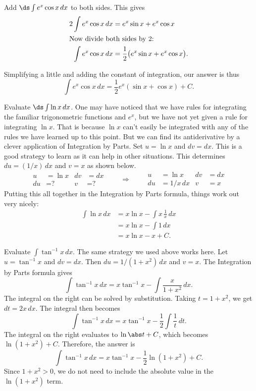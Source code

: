 \begin{example}
Add $\ds\int e^x\cos x\, dx$ to both sides. This gives 
\begin{align*}
2\int e^x\cos x\, dx & = e^x\sin x + e^x\cos x \\
\intertext{Now divide both sides by 2:}
\int e^x\cos x\, dx & = \frac{1}{2}\big(e^x\sin x + e^x\cos x\big).
\end{align*}

Simplifying a little and adding the constant of integration, our answer is thus
\[\int e^x\cos x\, dx = \frac12e^x\left(\sin x + \cos x\right)+C.\]
\end{example}

\begin{example}\label{ex_ibp5}
Evaluate $\ds\int \ln x\,dx$.
\solution
One may have noticed that we have rules for integrating the familiar trigonometric functions and $e^x$, but we have not yet given a rule for integrating $\ln x$.  That is because $\ln x$ can't easily be integrated with any of the rules we have learned up to this point.  But we can find its antiderivative by a clever application of Integration by Parts.  Set $u=\ln x$ and $dv=dx$.  This is a good strategy to learn as it can help in other situations. This determines $du=(1/x)\,dx$ and $v=x$ as shown below.
\[
\begin{aligned}
u&= \ln x & dv&=dx\\
du&= \text{?} & v&=\text{?}
\end{aligned}
\qquad\Rightarrow\qquad
\begin{aligned}
u&= \ln x& dv&=dx\\
du&= 1/x\, dx & v&=x
\end{aligned}
\]
Putting this all together in the Integration by Parts formula, things work out very nicely:
\begin{align*}
 \int \ln x\,dx
 &= x\ln x - \int x\,\frac1x\,dx \\
 &= x\ln x - \int 1\,dx \\
 &= x\ln{x} - x + C.
\end{align*}
\end{example}

\begin{example}\label{ex_ibp6}
Evaluate $\displaystyle \int \tan^{-1} x  \,dx$.
\solution
The same strategy we used above works here.  Let $u=\tan^{-1} x$ and $dv=dx$.  Then $du=1/(1+x^2)\,dx$ and $v=x$.  The Integration by Parts formula gives
\[\int \tan^{-1} x \,dx = x\tan^{-1} x - \int \frac x{1+x^2}\,dx.\]
The integral on the right can be solved by substitution.  Taking $t=1+x^2$, we get $dt=2x\,dx$.  The integral then becomes
\[\int \tan^{-1} x \,dx = x\tan^{-1} x - \frac12\int \frac 1{t}\,dt.\]
The integral on the right evaluates to $\ln\abs t+C$, which becomes $\ln(1+x^2)+C$.  Therefore, the answer is
\[\int \tan^{-1} x\, dx = x\tan^{-1} x - \frac12\ln(1+x^2) + C.\]
Since $1+x^2>0$, we do not need to include the absolute value in the $\ln(1+x^2)$ term.
\end{example}

